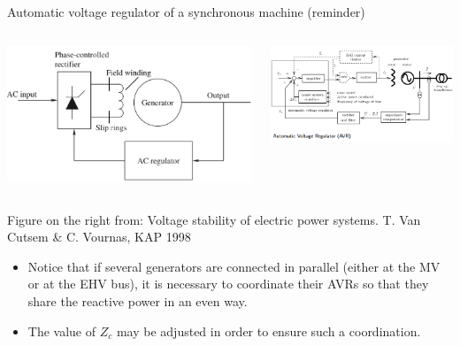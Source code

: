 \begin{frame}{Automatic voltage regulator of a synchronous machine (reminder)}
    \begin{columns}
        \begin{column}{0.35\textwidth}
            \includegraphics[width=\textwidth]{images/exciter.png}
        \end{column}
        \begin{column}{0.6\textwidth}
            \includegraphics[width=\textwidth]{images/avr.png}
        \end{column}
    \end{columns}
    \tiny{Figure on the right from: Voltage stability of electric power systems. T. Van Cutsem \& C. Vournas, KAP 1998}
    \begin{itemize}
        \item Notice that if several generators are connected in parallel (either at the MV or at the EHV bus), it is necessary to coordinate their AVRs so that they share the reactive power in an even way.
        \item The value of $Z_c$ may be adjusted in order to ensure such a coordination.
    \end{itemize}
\end{frame}


